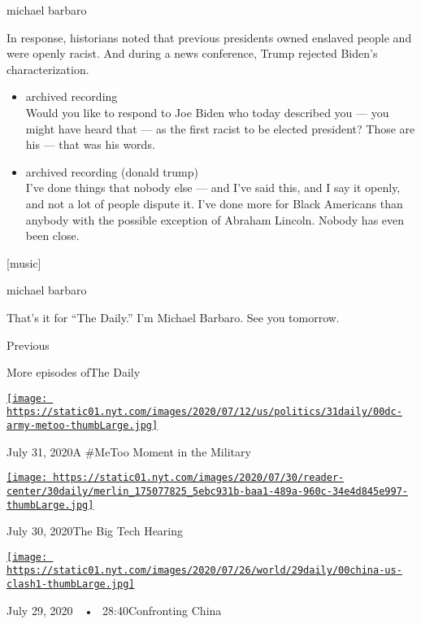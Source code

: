 michael barbaro

In response, historians noted that previous presidents owned enslaved
people and were openly racist. And during a news conference, Trump
rejected Biden's characterization.

\begin{itemize}
\item
  archived recording\\
  Would you like to respond to Joe Biden who today described you --- you
  might have heard that --- as the first racist to be elected president?
  Those are his --- that was his words.
\item
  archived recording (donald trump)\\
  I've done things that nobody else --- and I've said this, and I say it
  openly, and not a lot of people dispute it. I've done more for Black
  Americans than anybody with the possible exception of Abraham Lincoln.
  Nobody has even been close.
\end{itemize}

{[}music{]}

michael barbaro

That's it for ``The Daily.'' I'm Michael Barbaro. See you tomorrow.

Previous

More episodes ofThe Daily

\href{https://www.nytimes.com/2020/07/31/podcasts/the-daily/vanessa-guillen-military-metoo.html?action=click\&module=audio-series-bar\&region=header\&pgtype=Article}{\texttt{[image: https://static01.nyt.com/images/2020/07/12/us/politics/31daily/00dc-army-metoo-thumbLarge.jpg]}}

July 31, 2020A \#MeToo Moment in the Military

\href{https://www.nytimes.com/2020/07/30/podcasts/the-daily/congress-facebook-amazon-google-apple.html?action=click\&module=audio-series-bar\&region=header\&pgtype=Article}{\texttt{[image: https://static01.nyt.com/images/2020/07/30/reader-center/30daily/merlin\_175077825\_5ebc931b-baa1-489a-960c-34e4d845e997-thumbLarge.jpg]}}

July 30, 2020The Big Tech Hearing

\href{https://www.nytimes.com/2020/07/29/podcasts/the-daily/china-trump-foreign-policy.html?action=click\&module=audio-series-bar\&region=header\&pgtype=Article}{\texttt{[image: https://static01.nyt.com/images/2020/07/26/world/29daily/00china-us-clash1-thumbLarge.jpg]}}

July 29, 2020~~•~ 28:40Confronting China

